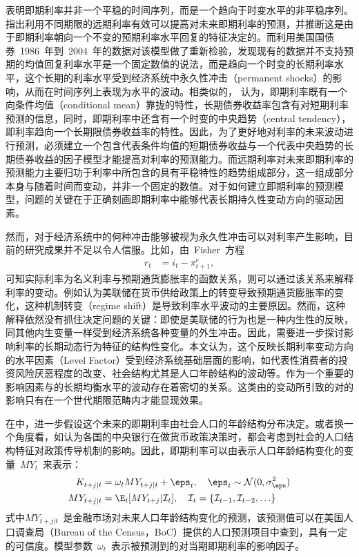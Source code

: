 表明即期利率并非一个平稳的时间序列，而是一个趋向于时变水平的非平稳序列。指出利用不同期限的远期利率有效可以提高对未来即期利率的预测，并推断这是由于即期利率朝向一个不变的预期利率水平回复的特征决定的。而利用美国国债券~1986~年到~2004~年的数据对该模型做了重新检验，发现现有的数据并不支持预期的均值回复利率水平是一个固定数值的说法，而是趋向一个时变的长期利率水平，这个长期的利率水平受到经济系统中永久性冲击（permanent shocks）的影响，从而在时间序列上表现为水平的波动。相类似的， 认为，即期利率既有一个向条件均值（conditional mean）靠拢的特性，长期债券收益率包含有对短期利率预测的信息，同时，即期利率中还含有一个时变的中央趋势（central tendency），即利率趋向一个长期限债券收益率的特性。因此，为了更好地对利率的未来波动进行预测，必须建立一个包含代表条件均值的短期债券收益与一个代表中央趋势的长期债券收益的因子模型才能提高对利率的预测能力。而远期利率对未来即期利率的预测能力主要归功于利率中所包含的具有平稳特性的趋势组成部分，这一组成部分本身与随着时间而变动，并非一个固定的数值。对于如何建立即期利率的预测模型，问题的关键在于正确刻画即期利率中能够代表长期持久性变动方向的驱动因素。

 然而，对于经济系统中的何种冲击能够被视为永久性冲击可以对利率产生影响，目前的研究成果并不足以令人信服。比如，由~Fisher~方程
\begin{align}
  r_t &= i_t - \pi_{t+1}^e,
\end{align}
可知实际利率为名义利率与预期通货膨胀率的函数关系，则可以通过该关系来解释利率的变动。例如认为美联储在货币供给政策上的转变导致预期通货膨胀率的变化，这种机制转变（regime shift）是导致利率水平波动的主要原因。然而，这种解释依然没有抓住决定问题的关键：即使是美联储的行为也是一种内生性的反映，同其他内生变量一样受到经济系统各种变量的外生冲击。因此，需要进一步探讨影响利率的长期动态行为特征的结构性变化。本文认为，这个反映长期利率变动方向的水平因素（Level Factor）受到经济系统基础层面的影响，如代表性消费者的投资风险厌恶程度的改变、社会结构尤其是人口年龄结构的波动等。\ds 作为一个重要的影响因素与\ts 的长期均衡水平的波动存在着密切的关系。这类由\ds 的变动所引致的对\tsm 的影响只有在一个世代期限范畴内才能显现效果。

在中，进一步假设这个未来的即期利率由社会人口的年龄结构分布决定。或者换一个角度看，如认为各国的中央银行在做货币政策决策时，都会考虑到社会的人口结构特征对政策传导机制的影响。因此，即期利率可以由表示人口年龄结构变化的变量~$MY_t$~来表示：
 \begin{align}
   K_{t+j|t}  &= \omega_t MY_{t+j|t}+\eps_t, \quad \eps_t \sim \mathcal{N}(0,\sigma^2_{\eps})\\
   MY_{t+j|t} &= \E_t [MY_{t+j}|\mathcal{I}_t],\quad \mathcal{I}_t=\{\mathcal{I}_{t-1},\mathcal{I}_{t-2},\ldots\}
 \end{align}
式中$MY_{t+j|t}$~是金融市场对未来人口年龄结构变化的预测，该预测值可以在美国人口调查局（Bureau of the Census，BoC）提供的人口预测项目中查到，具有一定的可信度。模型参数~$\omega_t$~表示被预测到的\dsf 对当期即期利率的影响因子。

